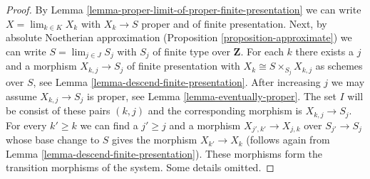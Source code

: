 \documentclass[10pt,a4paper]{amsart}
\theoremstyle{plain}
\theoremstyle{definition}
\theoremstyle{remark}
\numberwithin{equation}{subsection}
\def\lim{\mathop{\mathrm{lim}}\nolimits}
\begin{document}
\begin{proof}
By Lemma \ref{lemma-proper-limit-of-proper-finite-presentation}
we can write $X = \lim_{k \in K} X_k$ with $X_k \to S$ proper and
of finite presentation. Next, by absolute Noetherian approximation
(Proposition \ref{proposition-approximate}) we can
write $S = \lim_{j \in J} S_j$ with $S_j$ of finite type over $\mathbf{Z}$.
For each $k$ there exists a $j$ and a morphism $X_{k, j} \to S_j$
of finite presentation with $X_k \cong S \times_{S_j} X_{k, j}$
as schemes over $S$, see
Lemma \ref{lemma-descend-finite-presentation}.
After increasing $j$ we may assume $X_{k, j} \to S_j$ is proper, see
Lemma \ref{lemma-eventually-proper}. The set $I$ will be consist
of these pairs $(k, j)$ and the corresponding morphism is $X_{k, j} \to S_j$.
For every $k' \geq k$ we can find a $j' \geq j$ and a morphism
$X_{j', k'} \to X_{j, k}$ over $S_{j'} \to S_j$ whose base change to $S$
gives the morphism $X_{k'} \to X_k$ (follows again from
Lemma \ref{lemma-descend-finite-presentation}).
These morphisms form the transition morphisms of the system. Some details
omitted.
\end{proof}
\end{document}
